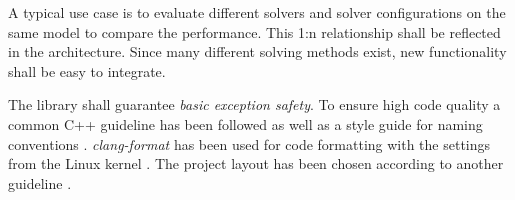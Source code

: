 A typical use case is to evaluate different solvers and solver configurations on the same model to compare the performance. This 1:n relationship shall be reflected in the architecture. 
Since many different solving methods exist, new functionality shall be easy to integrate.

The library shall guarantee \emph{basic exception safety}. 
To ensure high code quality a common C++ guideline has been followed \autocite{guideline} as well as a style guide for naming conventions \autocite{style}. \emph{clang-format} has been used for code formatting with the settings from the Linux kernel \autocite{format}. 
The project layout has been chosen according to another guideline \autocite{layout}.